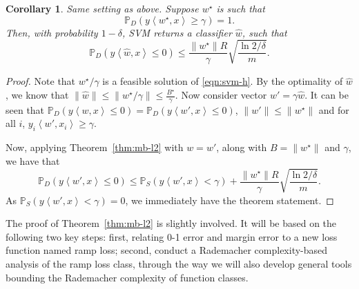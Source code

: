 \documentclass{article}
\newtheorem{theorem}{Theorem}
\newtheorem{corollary}{Corollary}
\DeclareMathOperator*{\Xcal}{{\cal X}}
\newcommand{\RR}{\mathbb{R}} %
\newcommand{\PP}{\mathbb{P}}
\newcommand{\inner}[2]{\left\langle #1,#2 \right\rangle}
\begin{document}
\begin{corollary}
Same setting as above. Suppose $w^\star$ is such that %
\[ \PP_{D}(y \inner{w^\star}{x} \geq \gamma) = 1. \]
Then, with probability $1-\delta$, SVM returns a classifier $\hat{w}$, such that
\[ \PP_D( y \inner{\hat{w}}{x} \leq 0 )
   \leq
   \frac{\| w^\star \| R}{\gamma} \sqrt{\frac{\ln2/\delta}{m}}.
 \]
\end{corollary}
\begin{proof}
Note that $w^\star / \gamma$ is a feasible solution of \ref{eqn:svm-h}. By the optimality of $\hat{w}$, we know that $\| \hat{w} \| \leq \| w^\star / \gamma \| \leq \frac{B^\star}{\gamma}$. Now consider vector $w' = \gamma \hat{w}$.
It can be seen that $\PP_D( y \inner{w}{x} \leq 0 ) = \PP_D( y \inner{w'}{x} \leq 0 )$, $\| w' \| \leq \| w^\star \|$ and for all $i$, $y_i \inner{w'}{x_i} \geq \gamma$.

Now, applying Theorem~\ref{thm:mb-l2} with $w = w'$, along with
$B = \| w^\star \|$ and $\gamma$, we have that
\[ \PP_D( y \inner{w'}{x} \leq 0 )
\leq \PP_S (y \inner{w'}{x} < \gamma) + \frac{\| w^\star \| R}{\gamma} \sqrt{\frac{\ln2/\delta}{m}}. \]
As $\PP_S (y \inner{w'}{x} < \gamma) = 0$, we immediately have the theorem statement.
\end{proof}

The proof of Theorem~\ref{thm:mb-l2} is slightly involved. It will be based on the following two key steps: first, relating 0-1 error and margin error to a new loss function named ramp loss; second, conduct a Rademacher complexity-based analysis of the ramp loss class, through the way we will also develop general tools bounding the Rademacher complexity of function classes.





\end{document}

